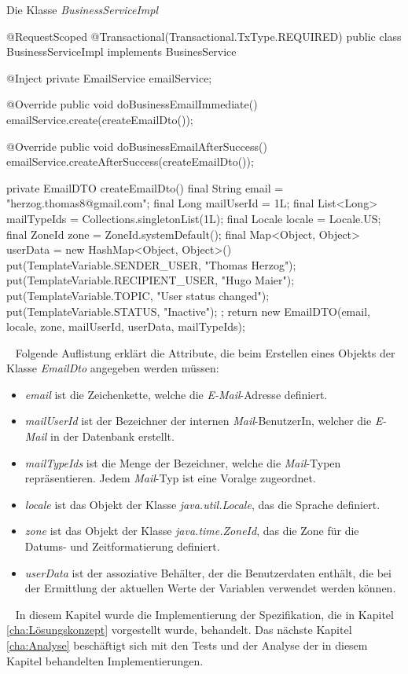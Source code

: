 \begin{program}[h]
\caption{Die Klasse \emph{BusinessServiceImpl}}
\label{prog:businessServiceImpl}
\begin{JavaCode}
@RequestScoped
@Transactional(Transactional.TxType.REQUIRED)
public class BusinessServiceImpl implements BusinesService {

    @Inject
    private EmailService emailService;
    
    @Override
    public void doBusinessEmailImmediate() {
        emailService.create(createEmailDto());
    }

    @Override
    public void doBusinessEmailAfterSuccess() {
        emailService.createAfterSuccess(createEmailDto());
    }

    private EmailDTO createEmailDto() {
        final String email = "herzog.thomas8@gmail.com";
        final Long mailUserId = 1L;
        final List<Long> mailTypeIds = Collections.singletonList(1L);
        final Locale locale = Locale.US;
        final ZoneId zone = ZoneId.systemDefault();
        final Map<Object, Object> userData = 
        	new HashMap<Object, Object>() {{
                put(TemplateVariable.SENDER_USER, "Thomas Herzog");
                put(TemplateVariable.RECIPIENT_USER, "Hugo Maier");
                put(TemplateVariable.TOPIC, "User status changed");
                put(TemplateVariable.STATUS, "Inactive");
            }};            
        return new EmailDTO(email, 
        					locale, 
        					zone, 
        					mailUserId, 
        					userData, 
        					mailTypeIds);
    }
    
}
\end{JavaCode}
\end{program}
\ \newline
Folgende Auflistung erklärt die Attribute, die beim Erstellen eines Objekts der Klasse \emph{EmailDto} angegeben werden müssen:
\begin{itemize}
	\item\emph{email} ist die Zeichenkette, welche die \emph{E-Mail}-Adresse definiert.
	\item\emph{mailUserId} ist der Bezeichner der internen \emph{Mail}-BenutzerIn, welcher die \emph{E-Mail} in der Datenbank erstellt.
	\item\emph{mailTypeIds} ist die Menge der Bezeichner, welche die \emph{Mail}-Typen repräsentieren. Jedem \emph{Mail}-Typ ist eine Voralge zugeordnet.
	\item\emph{locale} ist das Objekt der Klasse \emph{java.util.Locale}, das die Sprache definiert.
	\item\emph{zone} ist das Objekt der Klasse \emph{java.time.ZoneId}, das die Zone für die Datums- und Zeitformatierung definiert.
	\item\emph{userData} ist der assoziative Behälter, der die Benutzerdaten enthält, die bei der Ermittlung der aktuellen Werte der Variablen verwendet werden können.
\end{itemize}
\ \newline
In diesem Kapitel wurde die Implementierung der Spezifikation, die in Kapitel \ref{cha:Lösungskonzept} vorgestellt wurde, behandelt. Das nächste Kapitel \ref{cha:Analyse} beschäftigt sich mit den Tests und der Analyse der in diesem Kapitel behandelten Implementierungen.